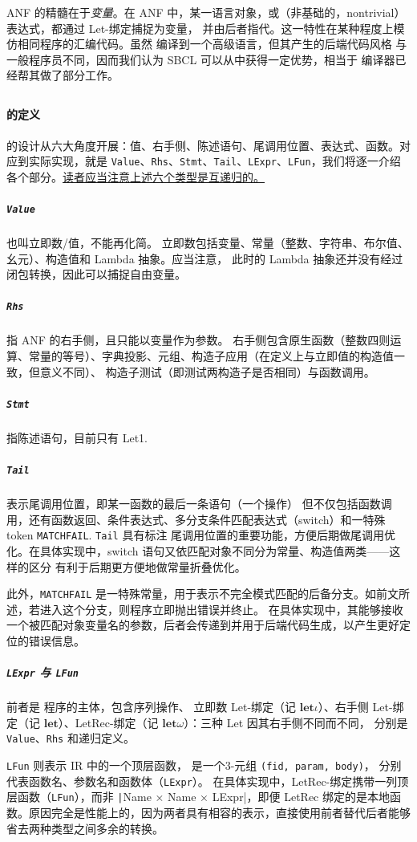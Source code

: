 \documentclass[a4paper, 11pt]{article}
\theoremstyle{remark}\newtheorem*{remark}{Remark}
\theoremstyle{definition}\newtheorem*{definition}{Definition}
\begin{document}
ANF 的精髓在于\emph{变量}。在 ANF 中，某一语言对象，或（非基础的，nontrivial）表达式，都通过 Let-绑定捕捉为变量，
并由后者指代。这一特性在某种程度上模仿相同程序的汇编代码。虽然 \Tigris 编译到一个高级语言，但其产生的后端代码风格
与一般程序员不同，因而我们认为 SBCL 可以从中获得一定优势，相当于 \Tigris 编译器已经帮其做了部分工作。

\subsection{\Lambdair}
\paragraph{\Lambdair 的定义}
\Lambdair 的设计从六大角度开展：值、右手侧、陈述语句、尾调用位置、表达式、函数。对应到实际实现，就是
\texttt{Value}、\texttt{Rhs}、\texttt{Stmt}、\texttt{Tail}、\texttt{LExpr}、\texttt{LFun}，我们将逐一介绍
各个部分。\underline{读者应当注意上述六个类型是互递归的。}

\subparagraph*{\texttt{Value}} 也叫立即数/值，不能再化简。
立即数包括变量、常量（整数、字符串、布尔值、幺元）、构造值和 Lambda 抽象。应当注意，
此时的 Lambda 抽象还并没有经过闭包转换，因此可以捕捉自由变量。
\subparagraph*{\texttt{Rhs}} 指 ANF 的右手侧，且只能以变量作为参数。
右手侧包含原生函数（整数四则运算、常量的等号）、字典投影、元组、构造子应用（在定义上与立即值的构造值一致，但意义不同）、
构造子测试（即测试两构造子是否相同）与函数调用。
\subparagraph*{\texttt{Stmt}} 指陈述语句，目前只有 Let1.
\subparagraph*{\texttt{Tail}} 表示尾调用位置，即某一函数的最后一条语句（一个操作）
但不仅包括函数调用，还有函数返回、条件表达式、多分支条件匹配表达式（switch）和一特殊 token \texttt{MATCHFAIL}. \texttt{Tail} 具有标注
尾调用位置的重要功能，方便后期做尾调用优化。在具体实现中，switch 语句又依匹配对象不同分为常量、构造值两类——这样的区分
有利于后期更方便地做常量折叠优化。

此外，\texttt{MATCHFAIL} 是一特殊常量，用于表示不完全模式匹配的后备分支。如前文所述，若进入这个分支，则程序立即抛出错误并终止。
在具体实现中，其能够接收一个被匹配对象变量名的参数，后者会传递到并用于后端代码生成，以产生更好定位的错误信息。

\subparagraph{\texttt{LExpr} 与 \texttt{LFun}} 前者是 \Lambdair 程序的主体，包含序列操作、
立即数 Let-绑定（记 $\mathbf{let}\iota$）、右手侧 Let-绑定（记 $\mathbf{let}$）、LetRec-绑定（记 $\mathbf{let}\omega$）：三种 Let 因其右手侧不同而不同，
分别是 \texttt{Value}、\texttt{Rhs} 和递归定义。

\texttt{LFun} 则表示 IR 中的一个顶层函数，
是一个3-元组 \texttt{(fid, param, body)}，
分别代表函数名、参数名和函数体（\texttt{LExpr}）。
在具体实现中，LetRec-绑定携带一列顶层函数（\texttt{LFun}），而非 \texttt|Name × Name × LExpr|，即便
LetRec 绑定的是本地函数。原因完全是性能上的，因为两者具有相容的表示，直接使用前者替代后者能够省去两种类型之间多余的转换。
\end{document}
